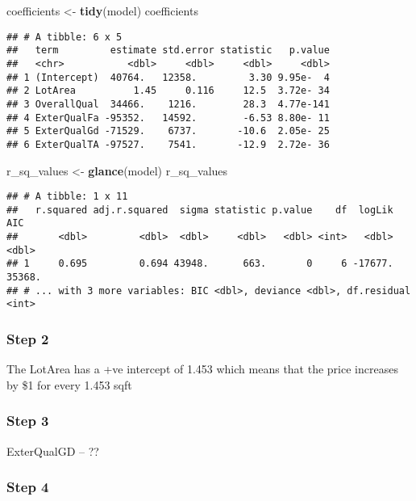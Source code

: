 \documentclass[]{article}
\newenvironment{Shaded}{\begin{snugshade}}{\end{snugshade}}
\newcommand{\KeywordTok}[1]{\textcolor[rgb]{0.13,0.29,0.53}{\textbf{#1}}}
\newcommand{\StringTok}[1]{\textcolor[rgb]{0.31,0.60,0.02}{#1}}
\newcommand{\NormalTok}[1]{#1}
\begin{document}
\begin{Shaded}
\begin{Highlighting}[]
\NormalTok{coefficients <-}\StringTok{ }\KeywordTok{tidy}\NormalTok{(model)}
\NormalTok{coefficients}
\end{Highlighting}
\end{Shaded}

\begin{verbatim}
## # A tibble: 6 x 5
##   term         estimate std.error statistic   p.value
##   <chr>           <dbl>     <dbl>     <dbl>     <dbl>
## 1 (Intercept)  40764.   12358.         3.30 9.95e-  4
## 2 LotArea          1.45     0.116     12.5  3.72e- 34
## 3 OverallQual  34466.    1216.        28.3  4.77e-141
## 4 ExterQualFa -95352.   14592.        -6.53 8.80e- 11
## 5 ExterQualGd -71529.    6737.       -10.6  2.05e- 25
## 6 ExterQualTA -97527.    7541.       -12.9  2.72e- 36
\end{verbatim}

\begin{Shaded}
\begin{Highlighting}[]
\NormalTok{r_sq_values <-}\StringTok{ }\KeywordTok{glance}\NormalTok{(model)}
\NormalTok{r_sq_values}
\end{Highlighting}
\end{Shaded}

\begin{verbatim}
## # A tibble: 1 x 11
##   r.squared adj.r.squared  sigma statistic p.value    df  logLik    AIC
##       <dbl>         <dbl>  <dbl>     <dbl>   <dbl> <int>   <dbl>  <dbl>
## 1     0.695         0.694 43948.      663.       0     6 -17677. 35368.
## # ... with 3 more variables: BIC <dbl>, deviance <dbl>, df.residual <int>
\end{verbatim}

\subsubsection{Step 2}\label{step-2-1}

The LotArea has a +ve intercept of 1.453 which means that the price
increases by \$1 for every 1.453 sqft

\subsubsection{Step 3}\label{step-3-1}

ExterQualGD -- ??

\subsubsection{Step 4}\label{step-4-1}
\end{document}
